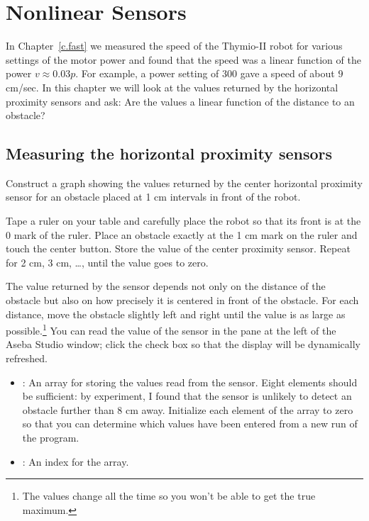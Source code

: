 \chapter{Nonlinear Sensors}

In Chapter~\ref{c.fast} we measured the speed of the Thymio-II robot for
various settings of the motor power and found that the speed was a
linear function of the power $v \approx 0.03p$. For example, a power
setting of $300$ gave a speed of about $9$ cm/sec. In this chapter we
will look at the values returned by the horizontal proximity sensors and
ask: Are the values a linear function of the distance to an obstacle?

\section{Measuring the horizontal proximity sensors}


Construct a graph showing the values returned by the center horizontal
proximity sensor for an obstacle placed at 1 cm intervals in front of
the robot.


Tape a ruler on your table and carefully place the robot so that its
front is at the 0 mark of the ruler. Place an obstacle exactly at the 1
cm mark on the ruler and touch the center button. Store the value of
the center proximity sensor. Repeat for 2 cm, 3 cm, \ldots, until the
value goes to zero.

The value returned by the sensor depends not only on the distance of the
obstacle but also on how precisely it is centered in front of the
obstacle. For each distance, move the obstacle slightly left and right
until the value is as large as possible.\footnote{The values change all
the time so you won't be able to get the true maximum.} You can read the
value of the sensor in the  pane at the left of the Aseba
Studio window; click the check box  so that the display will be
dynamically refreshed.


\begin{itemize}

\item {}: An array for storing the values read from the
sensor. Eight elements should be sufficient: by experiment, I found that
the sensor is unlikely to detect an obstacle further than 8 cm away.
Initialize each element of the array to zero so that you can determine
which values have been entered from a new run of the program.

\item {}: An index for the array. 

\end{itemize}


